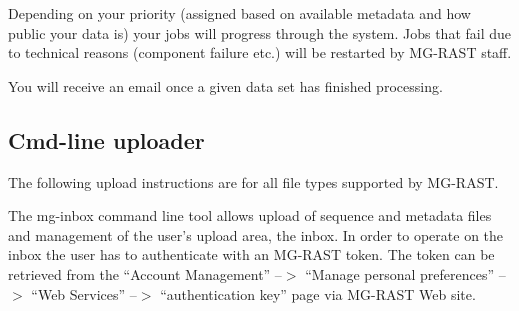 \documentclass[12pt,fullpage]{report}
\begin{document}
Depending on your priority (assigned based on available metadata and how public your data is) your jobs will progress through the system. Jobs that fail due to technical reasons (component failure etc.) will be restarted by MG-RAST staff.

You will receive an email once a given data set has finished processing.


\subsection{Cmd-line uploader}

The following upload instructions are for all file types supported by MG-RAST.

The mg-inbox command line tool allows upload of sequence and metadata files and management of the user’s upload area, the inbox. In order to operate on the inbox the user has to authenticate with an MG-RAST token. The token can be retrieved from the “Account Management” --$>$ “Manage personal preferences” --$>$ “Web Services” --$>$ “authentication key” page via MG-RAST Web site.
\end{document}
